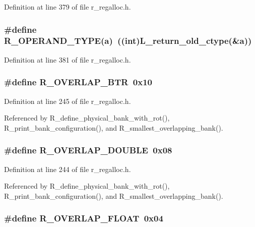 Definition at line 379 of file r\_\-regalloc.h.
\subsubsection{\setlength{\rightskip}{0pt plus 5cm}\#define R\_\-OPERAND\_\-TYPE(a)~((int)L\_\-return\_\-old\_\-ctype(\&a))}\label{r__regalloc_8h_08c55d5d5e34555d4592df786889ae32}




Definition at line 381 of file r\_\-regalloc.h.
\subsubsection{\setlength{\rightskip}{0pt plus 5cm}\#define R\_\-OVERLAP\_\-BTR~0x10}\label{r__regalloc_8h_917af45a185cb780374de53f599f0753}




Definition at line 245 of file r\_\-regalloc.h.

Referenced by R\_\-define\_\-physical\_\-bank\_\-with\_\-rot(), R\_\-print\_\-bank\_\-configuration(), and R\_\-smallest\_\-overlapping\_\-bank().
\subsubsection{\setlength{\rightskip}{0pt plus 5cm}\#define R\_\-OVERLAP\_\-DOUBLE~0x08}\label{r__regalloc_8h_f18adf94e4ed40b9f4f4af2601c3f204}




Definition at line 244 of file r\_\-regalloc.h.

Referenced by R\_\-define\_\-physical\_\-bank\_\-with\_\-rot(), R\_\-print\_\-bank\_\-configuration(), and R\_\-smallest\_\-overlapping\_\-bank().
\subsubsection{\setlength{\rightskip}{0pt plus 5cm}\#define R\_\-OVERLAP\_\-FLOAT~0x04}\label{r__regalloc_8h_3269b3446c26991b694a48593efc3368}




